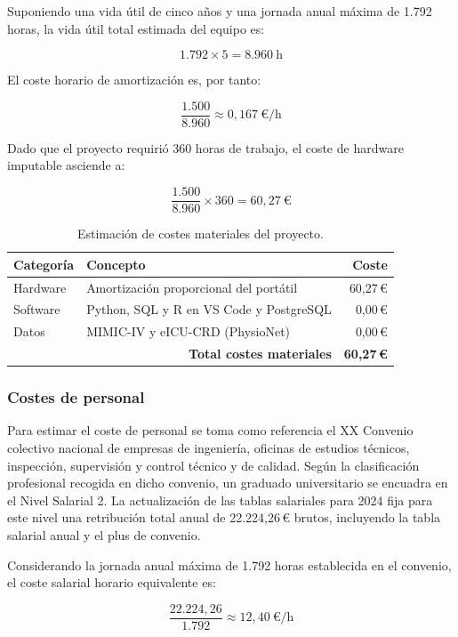 \documentclass[
  spanish,
  a4paper,
  12pt,
  twoside]{memoir}
\begin{document}
Suponiendo una vida útil de cinco años y una jornada anual máxima de 1.792 horas, la vida útil total estimada del equipo es:

\[
1.792 \times 5 = 8.960\ \text{h}
\]

El coste horario de amortización es, por tanto:

\[
\frac{1.500}{8.960} \approx 0{,}167\ \text{€/h}
\]

Dado que el proyecto requirió 360 horas de trabajo, el coste de hardware imputable asciende a:

\[
\frac{1.500}{8.960} \times 360 = 60{,}27\ \text{€}
\]

\begin{table}[H]
\centering
\caption{Estimación de costes materiales del proyecto.}
\label{tab:costes_materiales}
\begin{tabular}{llr}
\toprule
\textbf{Categoría} & \textbf{Concepto} & \textbf{Coste} \\
\midrule
Hardware  & Amortización proporcional del portátil & 60,27\,€ \\
Software  & Python, SQL y R en VS Code y PostgreSQL & 0,00\,€ \\
Datos     & MIMIC-IV y eICU-CRD (PhysioNet) & 0,00\,€ \\
\midrule
\multicolumn{2}{r}{\textbf{Total costes materiales}} & \textbf{60,27\,€} \\
\bottomrule
\end{tabular}
\end{table}

\subsubsection*{Costes de personal}

Para estimar el coste de personal se toma como referencia el XX Convenio colectivo nacional de empresas de ingeniería, oficinas de estudios técnicos, inspección, supervisión y control técnico y de calidad. Según la clasificación profesional recogida en dicho convenio, un graduado universitario se encuadra en el Nivel Salarial 2. La actualización de las tablas salariales para 2024 fija para este nivel una retribución total anual de 22.224,26\,€ brutos, incluyendo la tabla salarial anual y el plus de convenio.

Considerando la jornada anual máxima de 1.792 horas establecida en el convenio, el coste salarial horario equivalente es:

\[
\frac{22.224{,}26}{1.792} \approx 12{,}40\ \text{€/h}
\]
\end{document}
